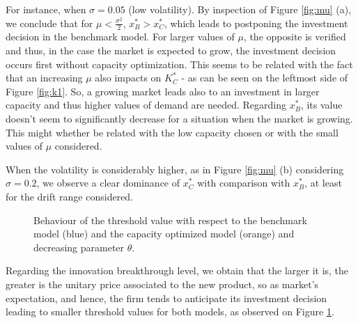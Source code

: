 For instance, when $\sigma=0.05$ (low volatility). By inspection of Figure  \ref{fig:mu} (a), we conclude that for $\mu<\frac{\sigma^2}{2}$, $x^*_B>x^*_C$, which leads to postponing the investment decision in the benchmark model. For larger values of $\mu$, the opposite is verified and thus, in the case the market is expected to grow, the investment decision occurs first without capacity optimization. This seems to be related with the fact that an increasing $\mu$ also impacts on $K_C^*$ - as can be seen on the leftmost side of Figure \ref{fig:k1}. So, a growing market leads also to an investment in larger capacity and thus higher values of demand are needed. Regarding $x^*_B$, its value doesn't seem to significantly decrease for a situation when the market is growing. This might whether be related with the low capacity chosen or with the small values of $\mu$ considered.

When the volatility is considerably higher, as in Figure \ref{fig:mu} (b) considering $\sigma=0.2$, we observe a clear dominance of $x^*_C$ with comparison with $x^*_B$, at least for the drift range considered.







\begin{figure}[!htb]
	\centering
	\caption{Behaviour of the threshold value with respect to the benchmark model (blue) and the capacity optimized model (orange) and decreasing parameter $\theta$.}
	\label{fig:td}
\end{figure}

Regarding the innovation breakthrough level, we obtain that the larger it is, the greater is the unitary price associated to the new product, so as market's expectation, and hence, the firm tends to anticipate its investment decision leading to smaller threshold values for both models, as observed on Figure \ref{fig:td}.



